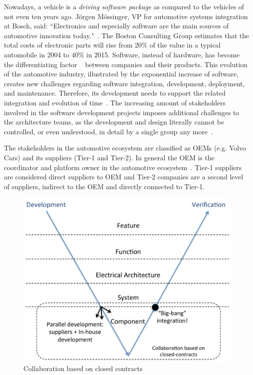 Nowadays, a vehicle is a {\em driving software package} as compared to the vehicles of not even ten years ago. J\"orgen M\"ossinger, VP for automotive systems integration at Bosch, said: ``Electronics and especially software are the main sources of automotive innovation today."~\cite{Mossinger2010SoftwareAutomotive}. The Boston Consulting Group estimates that the total costs of electronic parts will rise from 20\% of the value in a typical automobile in 2004 to 40\% in 2015. Software, instead of hardware, has become the differentiating factor%
~\cite{ConnectedVehicle2012,hbr2015hardwaresoftware,Mossinger2010SoftwareAutomotive,Broy:2006:CAS:1134285.1134292} %
between companies and their products. This evolution of the automotive industry, illustrated by the exponential increase of software, creates new challenges regarding software integration, development, deployment, and maintenance. Therefore, its development needs to support the related integration and evolution of time~\cite{Broy:2006:CAS:1134285.1134292,Patrizio2016AAF_Chalmers,qualman2009socialnomics,JansenTale2009}. The increasing amount of stakeholders involved in the software development projects imposes additional challenges to the architecture teams, as the development and design literally cannot be controlled, or even understood, in detail by a single group any more~\cite{Patrizio2016AAF_Chalmers}. 

The stakeholders in the automotive ecosystem are classified as OEMs (e.g. Volvo Cars) and its suppliers (Tier-1 and Tier-2). In general the OEM is the coordinator and platform owner in the automotive ecosystem~\cite{KS15,Patrizio2016AAF_Chalmers}. Tier-1 suppliers are considered direct suppliers to OEM and Tier-2 companies are a second level of suppliers, indirect to the OEM and directly connected to Tier-1. %

\begin{figure}[htb]
\centering
\includegraphics[width=\columnwidth]{figure/Closed-contract-collaboration.pdf}
\caption{Collaboration based on closed contracts}
\label{fig:closedContractCollaboration}
\end{figure}


